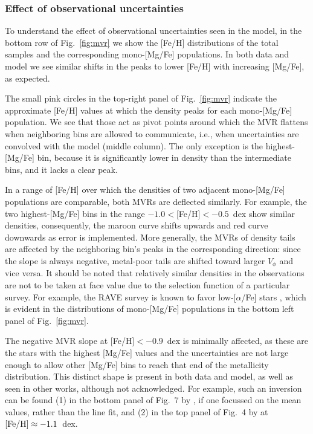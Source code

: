 \documentclass[usenatbib]{mnras}
\begin{document}
\subsubsection{Effect of observational uncertainties}

To understand the effect of observational uncertainties seen in the model, in the bottom row of Fig.~\ref{fig:mvr} we show the [Fe/H] distributions of the total samples and the corresponding mono-[Mg/Fe] populations. In both data and model we see similar shifts in the peaks to lower [Fe/H] with increasing [Mg/Fe], as expected. 

The small pink circles in the top-right panel of Fig.~\ref{fig:mvr} indicate the approximate [Fe/H] values at which the density peaks for each mono-[Mg/Fe] population. We see that those act as pivot points around which the MVR flattens when neighboring bins are allowed to communicate, i.e., when uncertainties are convolved with the model (middle column). The only exception is the highest-[Mg/Fe] bin, because it is significantly lower in density than the intermediate bins, and it lacks a clear peak.

In a range of [Fe/H] over which the densities of two adjacent mono-[Mg/Fe] populations are comparable, both MVRs are deflected similarly. For example, the two highest-[Mg/Fe] bins in the range $-1.0<$[Fe/H]$<-0.5$~dex show similar densities, consequently, the maroon curve shifts upwards and red curve downwards as error is implemented. More generally, the MVRs of density tails are affected by the neighboring bin's peaks in the corresponding direction: since the slope is always negative, metal-poor tails are shifted toward larger $V_\phi$ and vice versa. It should be noted that relatively similar densities in the observations are not to be taken at face value due to the selection function of a particular survey. For example, the RAVE survey is known to favor low-[$\alpha$/Fe] stars \citep{boeche13b}, which is evident in the distributions of mono-[Mg/Fe] populations in the bottom left panel of Fig.~\ref{fig:mvr}. 



The negative MVR slope at [Fe/H]$<-0.9$~dex is minimally affected, as these are the stars with the highest [Mg/Fe] values and the uncertainties are not large enough to allow other [Mg/Fe] bins to reach that end of the metallicity distribution. This distinct shape is present in both data and model, as well as seen in other works, although not acknowledged. For example, such an inversion can be found (1) in the bottom panel of Fig.~7 by \cite{lee11}, if one focussed on the mean values, rather than the line fit, and (2) in the top panel of Fig.~4 by \cite{adibekyan13} at $\rm [Fe/H]\approx -1.1$~dex.
\end{document}
